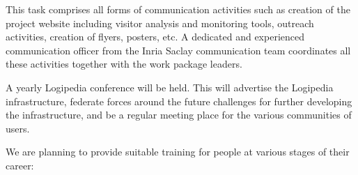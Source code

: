 \begin{workpackage}[id=dissemination,type=MGT,wphases=1-48,
  short={Dissemination},
  title={Dissemination, communication and exploitation},
  lead=Lie,LieRM=1,InrRM=6,BirRM=4,CleRM=2,ImtRM=2,StrRM=2,ZibRM=14,EduRM=12]
\begin{tasklist}

  \begin{task}[id=com,
      title=Communication,
      shorttitle=Comm.,
      lead=Inr,InrRM=6,wphases=1-48!.25]

    This task comprises all forms of communication activities such as
    creation of the project website including visitor analysis and
    monitoring tools, outreach activities, creation of flyers,
    posters, etc.  A dedicated and experienced communication officer
    from the Inria Saclay communication team coordinates all these
    activities together with the work package leaders.
  \end{task}

  \begin{task}[id=dissem,
      title=Dissemination,
      shorttitle=Dissem.,
      lead=Lie,LieRM=1,wphases=1-48]
    A yearly Logipedia conference will be held.  This will advertise the
    Logipedia infrastructure, federate forces around the future challenges for
    further developing the infrastructure, and be a regular meeting place for
    the various communities of users.

  \end{task}

  \begin{task}[id=training,
      title=Training Logipedia developers and users,
      shorttitle=Train.,
      lead=Bir,BirRM=2,wphases=1-48!.05]
    We are planning to provide suitable training
    for people at various stages of their career:


\end{task}
\end{tasklist}
\end{workpackage}
